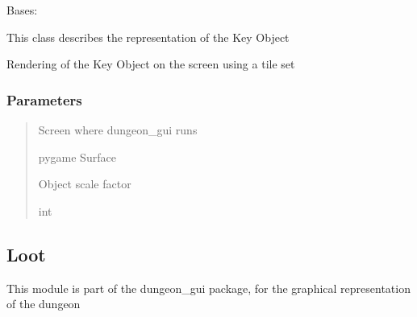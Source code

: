 \documentclass[letterpaper,10pt,english]{sphinxmanual}
\begin{document}
\begin{fulllineitems}
\label{\detokenize{api_reference/dungeon_gui/Key:Key.Key}}
\pysigstartsignatures
{}
\pysigstopsignatures
\sphinxAtStartPar
Bases: 

\sphinxAtStartPar
This class describes the representation of the Key Object

\begin{fulllineitems}
\label{\detokenize{api_reference/dungeon_gui/Key:Key.Key.render_collectable}}
\pysigstartsignatures
{}
\pysigstopsignatures
\sphinxAtStartPar
Rendering of the Key Object on the screen using a tile set


\subsubsection{Parameters}
\label{\detokenize{api_reference/dungeon_gui/Key:parameters}}\begin{quote}\begin{description}
\sphinxAtStartPar
Screen where dungeon\_gui runs

\sphinxAtStartPar
pygame Surface

\sphinxAtStartPar
Object scale factor

\sphinxAtStartPar
int

\end{description}\end{quote}

\end{fulllineitems}


\end{fulllineitems}


\sphinxstepscope


\subsection{Loot}
\label{\detokenize{api_reference/dungeon_gui/Loot:module-Loot}}\label{\detokenize{api_reference/dungeon_gui/Loot:loot}}\label{\detokenize{api_reference/dungeon_gui/Loot::doc}}
\sphinxAtStartPar
This module is part of the dungeon\_gui package, for the graphical representation of the dungeon
\end{document}
